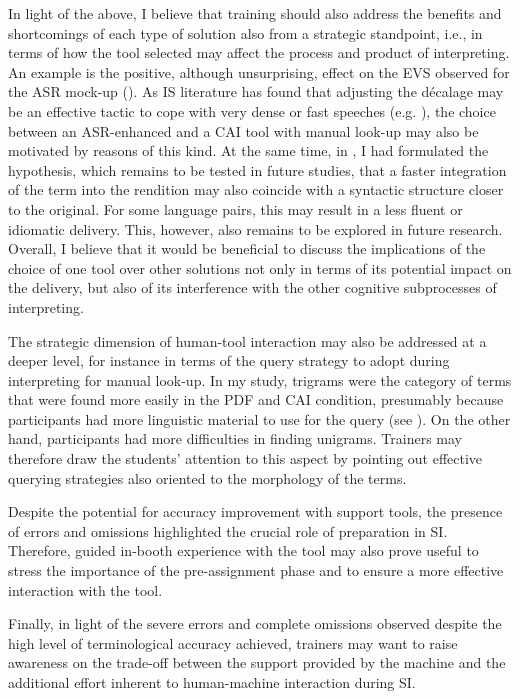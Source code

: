 In light of the above, I believe that training should also address the benefits and shortcomings of each type of solution also from a strategic standpoint, i.e., in terms of how the tool selected may affect the process and product of interpreting. An example is the positive, although unsurprising, effect on the EVS observed for the ASR mock-up (). As IS literature has found that adjusting the décalage may be an effective tactic to cope with very dense or fast speeches (e.g. \citealt{gile_basic_2009}), the choice between an ASR-enhanced and a CAI tool with manual look-up may also be motivated by reasons of this kind. At the same time, in , I had formulated the hypothesis, which remains to be tested in future studies, that a faster integration of the term into the rendition may also coincide with a syntactic structure closer to the original. For some language pairs, this may result in a less fluent or idiomatic delivery. This, however, also remains to be explored in future research. Overall, I believe that it would be beneficial to discuss the implications of the choice of one tool over other solutions not only in terms of its potential impact on the delivery, but also of its interference with the other cognitive subprocesses of interpreting.

The strategic dimension of human-tool interaction may also be addressed at a deeper level, for instance in terms of the query strategy to adopt during interpreting for manual look-up. In my study, trigrams were the category of terms that were found more easily in the PDF and CAI condition, presumably because participants had more linguistic material to use for the query (see ). On the other hand, participants had more difficulties in finding unigrams. Trainers may therefore draw the students' attention to this aspect by pointing out effective querying strategies also oriented to the morphology of the terms.

Despite the potential for accuracy improvement with support tools, the presence of errors and omissions highlighted the crucial role of preparation in SI. Therefore, guided in-booth experience with the tool may also prove useful to stress the importance of the pre-assignment phase and to ensure a more effective interaction with the tool.

Finally, in light of the severe errors and complete omissions observed despite the high level of terminological accuracy achieved, trainers may want to raise awareness on the trade-off between the support provided by the machine and the additional effort inherent to human-machine interaction during SI.

